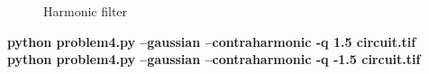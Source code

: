\begin{figure}[!htb]\centering
    \begin{minipage}{0.45\textwidth}
        \caption{\small{Harmonic filter}}\label{diagram:gaussian_harmonic}
    \end{minipage}
\end{figure}

\pagebreak
\begin{minipage}{\textwidth}
\textbf{python problem4.py --gaussian --contraharmonic -q 1.5 circuit.tif} \\
\textbf{python problem4.py --gaussian --contraharmonic -q -1.5 circuit.tif} \\
\end{minipage}

